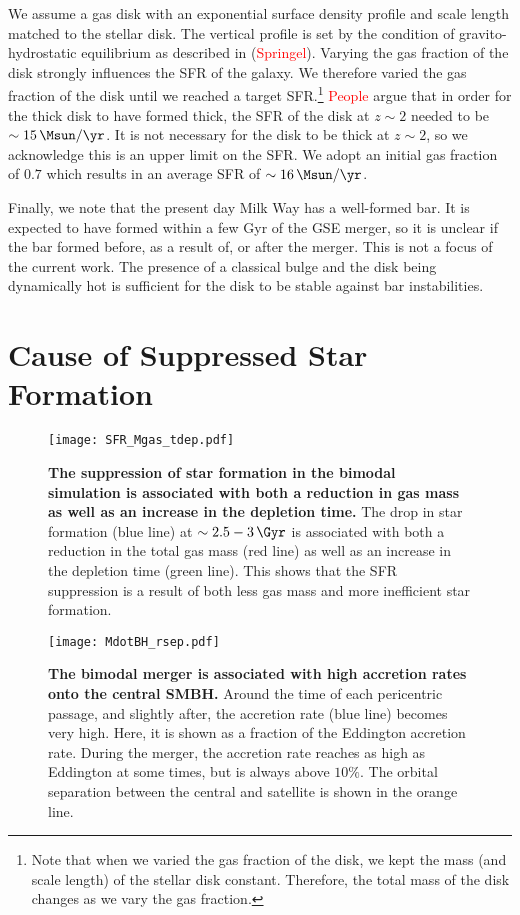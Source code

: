 We assume a gas disk with an exponential surface density profile and scale
length matched to the stellar disk. The vertical profile is set by the condition
of gravito-hydrostatic equilibrium as described in (\textcolor{red}{Springel}).
Varying the gas fraction of the disk strongly influences the SFR of the galaxy.
We therefore varied the gas fraction of the disk until we reached a target
SFR.\footnote{Note that when we varied the gas fraction of the disk, we kept the
mass (and scale length) of the stellar disk constant. Therefore, the total mass
of the disk changes as we vary the gas fraction.} \textcolor{red}{People} argue
that in order for the thick disk to have formed thick, the SFR of the disk at
$z\sim2$ needed to be $\sim15\,\Msun/\yr$. It is not necessary for the disk to
be thick at $z\sim2$, so we acknowledge this is an upper limit on the SFR. We
adopt an initial gas fraction of $0.7$ which results in an average SFR of
$\sim16\,\Msun/\yr$.

Finally, we note that the present day Milk Way has a well-formed bar. It is
expected to have formed within a few Gyr of the GSE merger, so it is unclear if
the bar formed before, as a result of, or after the merger. This is not a focus
of the current work. The presence of a classical bulge and the disk being
dynamically hot is sufficient for the disk to be stable against bar
instabilities.

\section{Cause of Suppressed Star Formation}

\begin{figure*}
  \centering
  \texttt{[image: SFR\_Mgas\_tdep.pdf]}
  \caption{\textbf{The suppression of star formation in the bimodal simulation is associated with both a reduction in gas mass as well as an increase in the depletion time.} The drop in star formation (blue line) at $\sim2.5-3\,\Gyr$ is associated with both a reduction in the total gas mass (red line) as well as an increase in the depletion time (green line). This shows that the SFR suppression is a result of both less gas mass and more inefficient star formation. }
  \label{fig:SFR_Mgas_tdep}
\end{figure*}

\begin{figure}
  \centering
  \texttt{[image: MdotBH\_rsep.pdf]}
  \caption{\textbf{The bimodal merger is associated with high accretion rates onto the central SMBH.} Around the time of each pericentric passage, and slightly after, the accretion rate (blue line) becomes very high. Here, it is shown as a fraction of the Eddington accretion rate. During the merger, the accretion rate reaches as high as Eddington at some times, but is always above $10\%$. The orbital separation between the central and satellite is shown in the orange line.}
  \label{fig:MdotBH_rsep}
\end{figure}